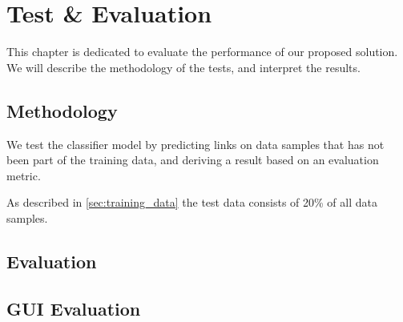 \chapter{Test \& Evaluation}\label{chap:testeval}
This chapter is dedicated to evaluate the performance of our proposed solution. We will describe the methodology of the tests, and interpret the results.

\section{Methodology}
We test the classifier model by predicting links on data samples that has not been part of the training data, and deriving a result based on an evaluation metric.

As described in \cref{sec:training_data} the test data consists of 20\% of all data samples.




\section{Evaluation}

\section{GUI Evaluation}
